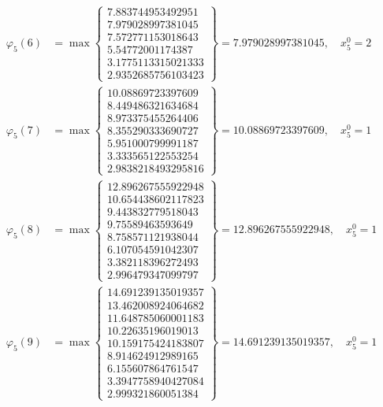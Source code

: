 \documentclass{article}
\begin{document}
\begin{align*}
  
\varphi_{5}(6) &= \max \left\{ \begin{array}{c}
7.883744953492951 \\
 7.979028997381045 \\
 7.572771153018643 \\
 5.54772001174387 \\
 3.1775113315021333 \\
 2.9352685756103423
\end{array} \right\} = 7.979028997381045, \quad x_{5}^0 = 2\\
  
  
  
  
\varphi_{5}(7) &= \max \left\{ \begin{array}{c}
10.08869723397609 \\
 8.449486321634684 \\
 8.973375455264406 \\
 8.355290333690727 \\
 5.951000799991187 \\
 3.333565122553254 \\
 2.9838218493295816
\end{array} \right\} = 10.08869723397609, \quad x_{5}^0 = 1\\
  
  
  
  
\varphi_{5}(8) &= \max \left\{ \begin{array}{c}
12.896267555922948 \\
 10.654438602117823 \\
 9.443832779518043 \\
 9.75589463593649 \\
 8.758571121938044 \\
 6.107054591042307 \\
 3.382118396272493 \\
 2.996479347099797
\end{array} \right\} = 12.896267555922948, \quad x_{5}^0 = 1\\
  
  
  
  
\varphi_{5}(9) &= \max \left\{ \begin{array}{c}
14.691239135019357 \\
 13.462008924064682 \\
 11.648785060001183 \\
 10.22635196019013 \\
 10.159175424183807 \\
 8.914624912989165 \\
 6.155607864761547 \\
 3.3947758940427084 \\
 2.999321860051384
\end{array} \right\} = 14.691239135019357, \quad x_{5}^0 = 1\\
  

\end{align*}
\end{document}

